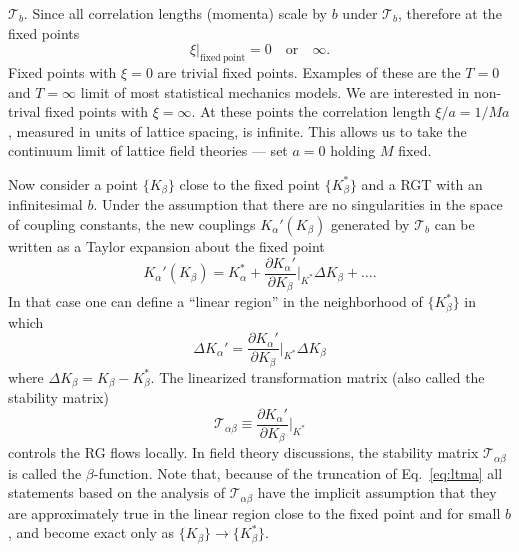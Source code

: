 $\mathcal{T}_b$.  Since all correlation lengths (momenta) scale by $b$
under $\mathcal{T}_b$, therefore at the fixed points
\begin{equation}
\xi\big|_{\mathrm{fixed\ point}} = 0 \quad \mathrm{or} \quad \infty.
\end{equation}
Fixed points with $\xi = 0$ are trivial fixed points.  Examples of
these are the $T = 0$ and $T = \infty$ limit of most statistical
mechanics models.  We are interested in non-trival fixed points with
$\xi = \infty$.  At these points the correlation length $\xi/a =
1/Ma$, measured in units of lattice spacing, is infinite.  This allows
us to take the continuum limit of lattice field theories --- set
$a = 0$ holding $M$ fixed.

Now consider a point $\{K_\beta\}$ close to the fixed point
$\{K_\beta^*\}$ and a RGT with an infinitesimal $b$.  Under the
assumption that there are no singularities in the space of coupling
constants, the new couplings $K_\alpha'(K_\beta)$ generated by
$\mathcal{T}_b$ can be written as a Taylor expansion about the fixed
point
\begin{equation}
K_\alpha'(K_\beta) = K_\alpha^* +
    \frac{\partial K_\alpha'}{\partial K_\beta}\bigg|_{K^*}\Delta K_\beta
    + \ldots.
\label{eq:ltma}
\end{equation}
In that case one can define a ``linear region'' in the neighborhood of
$\{K_\beta^*\}$ in which
\begin{equation}
\Delta K_\alpha' =
    \frac{\partial K_\alpha'}{\partial K_\beta}\bigg|_{K^*}\Delta K_\beta
\label{eq:ltmb}
\end{equation}
where $\Delta K_\beta = K_\beta - K_\beta^*$.  The linearized
transformation matrix (also called the stability matrix)
\begin{equation}
\mathcal{T}_{\alpha\beta} \equiv
    \frac{\partial K_\alpha'}{\partial K_\beta}\bigg|_{K^*}
\label{eq:ltmc}
\end{equation}
controls the RG flows locally.  In field theory discussions, the
stability matrix $\mathcal{T}_{\alpha\beta}$ is called the
$\beta$-function.  Note that, because of the truncation of
Eq.~\ref{eq:ltma} all statements based on the analysis of
$\mathcal{T}_{\alpha\beta}$ have the implicit assumption that they are
approximately true in the linear region close to the fixed point and
for small $b$, and become exact only as $\{K_\beta\} \to
\{K_\beta^*\}$.

